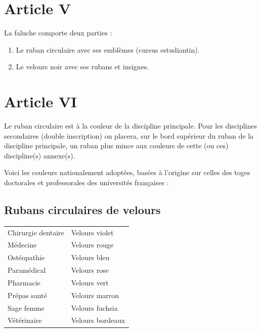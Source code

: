 \section{Article V}
La faluche comporte deux parties :
\begin{enumerate}
	\item Le ruban circulaire avec ses emblèmes (cursus estudiantin).
	\item Le velours noir avec ses rubans et insignes.
\end{enumerate}

\section{Article VI}
\label{Article VI}
         Le ruban circulaire est à la couleur de la discipline principale. Pour 
les disciplines secondaires (double inscription) on placera, sur le bord 
supérieur du ruban de la discipline principale, un ruban plus mince aux couleurs
de cette (ou ces) discipline(s) annexe(s).
\newline

         Voici les couleurs nationalement adoptées, basées à l'origine sur celles des toges
doctorales et professorales des universités françaises :

\subsection{Rubans circulaires de velours}
\begin{center}
\begin{tabularx}{1.2\textwidth}{XX}

Chirurgie dentaire & Velours violet\\ 
Médecine           & Velours rouge\\ 
Ostéopathie        & Velours bleu\\ 
Paramédical        & Velours rose\\ 
Pharmacie          & Velours vert \\ 
Prépas santé       & Velours marron\\ 
Sage femme         & Velours fuchsia\\
Vétérinaire        & Velours bordeaux\\
\end{tabularx}
\end{center}

